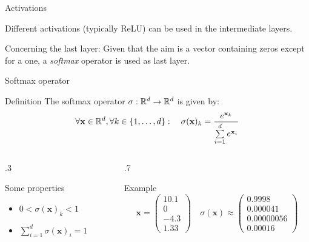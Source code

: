 \documentclass[xcolor=pdftex,dvipsnames,table,mathserif,aspectratio=169]{beamer}
\newcommand{\myvec}[1]{\ensuremath{\begin{pmatrix}#1\end{pmatrix}}}
\begin{document}
\begin{frame}{Activations}

  Different activations (typically ReLU) can be used in the intermediate layers.
  \vspace{1em}

  Concerning the last layer: Given that the aim is a vector containing zeros except for a one, a \emph{softmax} operator is used as last layer.


\end{frame}

\begin{frame}{Softmax operator}

  \begin{block}{Definition}
    The softmax operator $\sigma: \mathbb{R}^d \rightarrow \mathbb{R}^d$ is given by:
    \[
    \forall \mathbf{x}  \in \mathbb{R}^d, \forall k \in \{1, \ldots, d\}:\quad \sigma(\mathbf{x})_k = \frac{e^{\mathbf{x}_k}}{\sum\limits_{i=1}^d e^{\mathbf{x}_i}}
    \]
  \end{block}

  \pause

  \begin{columns}
    \begin{column}{.3\textwidth}
      \begin{block}{Some properties}
        \begin{itemize}
        \item $0 < \sigma(\mathbf{x})_k < 1$
        \item $\sum\limits_{i=1}^d \sigma(\mathbf{x})_i = 1$
        \end{itemize}
      \end{block}

    \end{column}

    \pause

    \begin{column}{.7\textwidth}

      \begin{block}{Example}
        \[
        \mathbf{x} = \myvec{10.1\\0\\-4.3\\1.33}  \quad \sigma(\mathbf{x}) \approx \myvec{0.9998\\0.000041\\0.00000056\\0.00016}
        \]

      \end{block}



    \end{column}
  \end{columns}



\end{frame}
\end{document}

